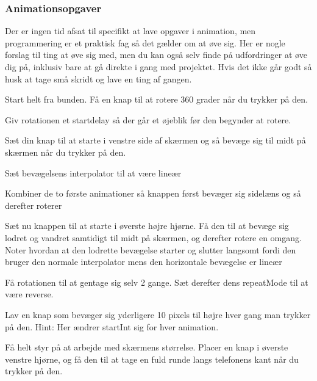 \subsubsection{Animationsopgaver}
Der er ingen tid afsat til specifikt at lave opgaver i animation, men programmering er et praktisk fag så det gælder om at øve sig. Her er nogle forslag til ting at øve sig med, men du kan også selv finde på udfordringer at øve dig på, inklusiv bare at gå direkte i gang med projektet. Hvis det ikke går godt så husk at tage små skridt og lave en ting af gangen.
\begin{exercise}
	Start helt fra bunden. Få en knap til at rotere 360 grader når du trykker på den.
\end{exercise}
\begin{exercise}
	Giv rotationen et startdelay så der går et øjeblik før den begynder at rotere.
\end{exercise}
\begin{exercise}
	Sæt din knap til at starte i venstre side af skærmen og så bevæge sig til midt på skærmen når du trykker på den.
\end{exercise}
\begin{exercise}
	Sæt bevægelsens interpolator til at være lineær
\end{exercise}
\begin{exercise}
	Kombiner de to første animationer så knappen først bevæger sig sidelæns og så derefter roterer
\end{exercise}
\begin{exercise}
	Sæt nu knappen til at starte i øverste højre hjørne. Få den til at bevæge sig lodret og vandret samtidigt til midt på skærmen, og derefter rotere en omgang. Noter hvordan at den lodrette bevægelse starter og slutter langsomt fordi den bruger den normale interpolator mens den horizontale bevægelse er lineær
\end{exercise}
\begin{exercise}
	Få rotationen til at gentage sig selv 2 gange. Sæt derefter dens repeatMode til at være reverse.
\end{exercise}
\begin{exercise}
	Lav en knap som bevæger sig yderligere 10 pixels til højre hver gang man trykker på den. Hint: Her ændrer startInt sig for hver animation.
\end{exercise}
\begin{exercise}
	Få helt styr på at arbejde med skærmens størrelse. Placer en knap i øverste venstre hjørne, og få den til at tage en fuld runde langs telefonens kant når du trykker på den. 
\end{exercise}